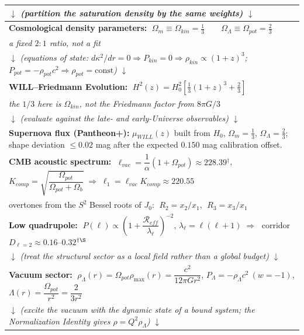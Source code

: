 \begin{tcolorbox}[colback=gray!5, colframe=black!80!black,
                  title=Derivation Chain Map --- WILL RG II (B): Stage II and Closure]
\begin{center}
\begin{tabular}{|>{\centering\arraybackslash}p{}|}
$\downarrow$ \textit{(partition the saturation density by the same weights)} $\downarrow$\\\hline
\textbf{Cosmological density parameters:} $\;\boxed{\Omega_{m}\equiv\Omega_{kin}=\tfrac{1}{3}}\qquad
\boxed{\Omega_{\Lambda}\equiv\Omega_{pot}=\tfrac{2}{3}}$\\
\textit{a fixed $2{:}1$ ratio, not a fit}\\[6pt]\hline
$\downarrow$ \textit{(equations of state: $d\kappa^{2}/dr=0\Rightarrow P_{kin}=0\Rightarrow\rho_{kin}\propto(1+z)^{3}$; \quad $P_{pot}=-\rho_{pot}c^{2}\Rightarrow\rho_{pot}=\mathrm{const}$)} $\downarrow$\\\hline
\textbf{WILL--Friedmann Evolution:} $\;\boxed{H^{2}(z)=H_{0}^{2}\left[\tfrac{1}{3}(1+z)^{3}+\tfrac{2}{3}\right]}$\\
\textit{the $1/3$ here is $\Omega_{kin}$, not the Friedmann factor from $8\pi G/3$}\\[6pt]\hline
$\downarrow$ \textit{(evaluate against the late- and early-Universe observables)} $\downarrow$\\\hline
\textbf{Supernova flux (Pantheon+):} $\mu_{WILL}(z)$ built from $H_{0}$, $\Omega_{m}=\tfrac13$, $\Omega_{\Lambda}=\tfrac23$;
shape deviation $\le0.02$ mag after the expected $0.150$ mag calibration offset.\\[4pt]\hline
\textbf{CMB acoustic spectrum:} $\;\ell_{vac}=\dfrac{1}{\alpha}(1+\Omega_{pot})\approx228.39$$^{\dagger}$, \quad
$K_{comp}=\sqrt{\dfrac{\Omega_{pot}}{\Omega_{pot}+\Omega_{b}}}\;\Longrightarrow\;
\boxed{\ell_{1}=\ell_{vac}K_{comp}\approx220.55}$\\[2pt]
overtones from the $S^{2}$ Bessel roots of $J_{0}$: $\;R_{2}=x_{2}/x_{1}$, $\;R_{3}=x_{3}/x_{1}$\\[6pt]\hline
\textbf{Low quadrupole:} $\;P(\ell)\propto\left(1+\dfrac{\mathcal{R}_{eff}}{\lambda_{\ell}}\right)^{-2}$, \quad
$\lambda_{\ell}=\ell(\ell+1)\;\Longrightarrow\;$ corridor $D_{\ell=2}\approx0.16$--$0.32$$^{\dagger\S}$\\[6pt]\hline
$\downarrow$ \textit{(treat the structural sector as a local field rather than a global budget)} $\downarrow$\\\hline
\textbf{Vacuum sector:} $\;\rho_{\Lambda}(r)=\Omega_{pot}\rho_{\max}(r)=\dfrac{c^{2}}{12\pi Gr^{2}}$, \quad
$P_{\Lambda}=-\rho_{\Lambda}c^{2}\ (w=-1)$, \quad
$\boxed{\Lambda(r)=\dfrac{\Omega_{pot}}{r^{2}}=\dfrac{2}{3r^{2}}}$\\[8pt]\hline
$\downarrow$ \textit{(excite the vacuum with the dynamic state of a bound system; the Normalization Identity gives $\rho=Q^{2}\rho_{\Lambda}$)} $\downarrow$\\\hline

\end{tabular}
\end{center}
\end{tcolorbox}
